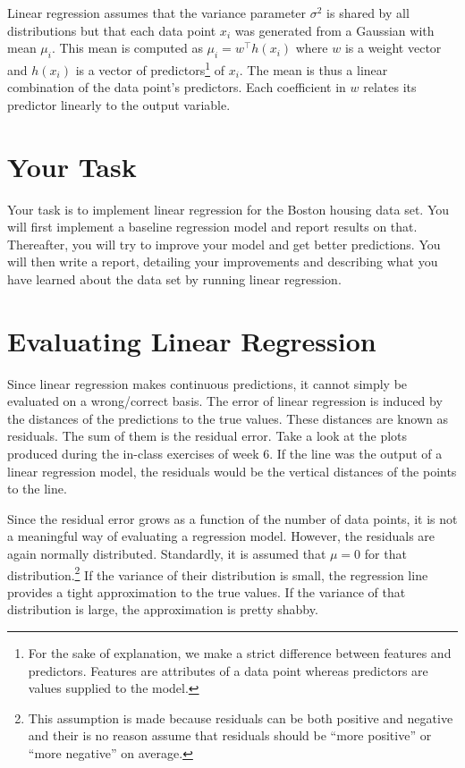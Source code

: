 \documentclass[11pt, leqno, a4paper]{article}
\begin{document}
Linear regression assumes that the variance parameter $ \sigma^{2} $ is shared by all distributions
but that each data point $ x_{i} $ was generated from a Gaussian with mean $ \mu_{i} $. This mean
is computed as $ \mu_{i} = w^{\top}h(x_{i}) $ where $ w $ is a weight vector and $ h(x_{i}) $ is
a vector of predictors\footnote{For the sake of explanation, we make a strict difference between
features and predictors. Features are attributes of a data point whereas predictors are values
supplied to the model.} of $ x_{i} $. The mean is thus a linear combination of the data point's predictors.
Each coefficient in $ w $ relates its predictor linearly to the output variable.

\section{Your Task}

Your task is to implement linear regression for the Boston housing data set. You will first implement
a baseline regression model and report results on that. Thereafter, you will try to improve your 
model and get better predictions. You will then write a report, detailing your improvements and 
describing what you have learned about the data set by running linear regression.

\section{Evaluating Linear Regression}

Since linear regression makes continuous predictions, it cannot simply be evaluated on a wrong/correct
basis. The error of linear regression is induced by the distances of the predictions to the true values.
These distances are known as residuals. The sum of them is the residual error. Take a look at the
plots produced during the in-class exercises of week 6. If the line was the output of a linear 
regression model, the residuals would be the vertical distances of the points to the line.

Since the residual error grows as a function of the number of data points, it is not a meaningful
way of evaluating a regression model. However, the residuals are again normally distributed. Standardly,
it is assumed that $ \mu=0 $ for that distribution.\footnote{This assumption is made because
residuals can be both positive and negative and their is no reason assume that residuals should
be ``more positive'' or ``more negative'' on average.} If the
variance of their distribution is small, the regression line provides a tight approximation to the
true values. If the variance of that distribution is large, the approximation is pretty shabby. 
\end{document}
